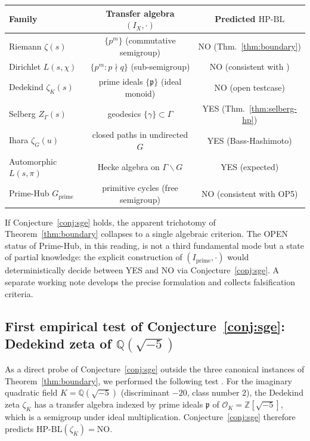 \documentclass[11pt]{article}
\theoremstyle{definition}
\theoremstyle{remark}
\newcommand{\HBL}{\mathrm{HP\text{-}BL}}
\begin{document}
\begin{center}
\begin{tabular}{@{}lcc@{}}
\toprule
Family & Transfer algebra $(I_X, \cdot)$ & Predicted $\HBL$ \\
\midrule
Riemann $\zeta(s)$ & $\{p^m\}$ (commutative semigroup) & NO (Thm.~\ref{thm:boundary}) \\
Dirichlet $L(s,\chi)$ & $\{p^m : p \nmid q\}$ (sub-semigroup) & NO (consistent with \cite{PaleyWienerDirichlet}) \\
Dedekind $\zeta_K(s)$ & prime ideals $\{\mathfrak{p}\}$ (ideal monoid) & NO (open testcase) \\
Selberg $Z_\Gamma(s)$ & geodesics $\{\gamma\} \subset \Gamma$ & YES (Thm.~\ref{thm:selberg-hp}) \\
Ihara $\zeta_G(u)$ & closed paths in undirected $G$ & YES (Bass-Hashimoto) \\
Automorphic $L(s,\pi)$ & Hecke algebra on $\Gamma\backslash G$ & YES (expected) \\
Prime-Hub $G_\mathrm{prime}$ & primitive cycles (free semigroup) & NO (consistent with OP5) \\
\bottomrule
\end{tabular}
\end{center}

If Conjecture~\ref{conj:sge} holds, the apparent trichotomy of
Theorem~\ref{thm:boundary} collapses to a single algebraic criterion.
The OPEN status of Prime-Hub, in this reading, is not a third
fundamental mode but a state of partial knowledge: the explicit
construction of $(I_\mathrm{prime}, \cdot)$ would deterministically
decide between YES and NO via Conjecture~\ref{conj:sge}. A separate
working note \cite{SGENote} develops the precise formulation and
collects falsification criteria.

\subsection[First empirical test of Conjecture: Dedekind zeta of Q(sqrt(-5))]{First empirical test of Conjecture~\ref{conj:sge}:
Dedekind zeta of \texorpdfstring{$\mathbb{Q}(\sqrt{-5})$}{Q(sqrt(-5))}}
\label{sec:sge-dedekind-test}

As a direct probe of Conjecture~\ref{conj:sge} outside the three
canonical instances of Theorem~\ref{thm:boundary}, we performed the
following test \cite{DedekindNEBTest}. For the imaginary quadratic
field $K = \mathbb{Q}(\sqrt{-5})$ (discriminant $-20$, class number
$2$), the Dedekind zeta $\zeta_K$ has a transfer algebra indexed by
prime ideals $\mathfrak{p}$ of $\mathcal{O}_K = \mathbb{Z}[\sqrt{-5}]$,
which is a semigroup under ideal multiplication. Conjecture~\ref{conj:sge}
therefore predicts $\HBL(\zeta_K) = \mathrm{NO}$.
\end{document}
